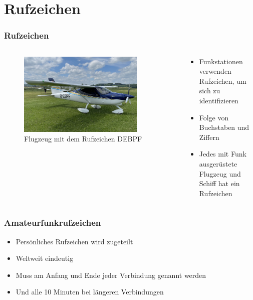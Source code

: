 
\section{Rufzeichen}
\label{section:rufzeichen}
\begin{frame}%

\frametitle{Rufzeichen}
\begin{columns}
    \begin{column}{0.48\textwidth}
    
\begin{figure}
    \includegraphics[width=0.85\textwidth]{foto/167}
    \caption{\scriptsize Flugzeug mit dem Rufzeichen DEBPF}
    \label{rufzeichen_flugzeug}
\end{figure}

    \end{column}
   \begin{column}{0.48\textwidth}
       \begin{itemize}
  \item Funkstationen verwenden Rufzeichen, um sich zu identifizieren
  \item Folge von Buchstaben und Ziffern
  \item Jedes mit Funk ausgerüstete Flugzeug und Schiff hat ein Rufzeichen
  \end{itemize}

   \end{column}
\end{columns}

\end{frame}

\begin{frame}
\frametitle{Amateurfunkrufzeichen}
\begin{itemize}
  \item Persönliches Rufzeichen wird zugeteilt
  \item Weltweit eindeutig
  \item Muss am Anfang und Ende jeder Verbindung genannt werden
  \item Und alle 10 Minuten bei längeren Verbindungen
  \end{itemize}
\end{frame}

